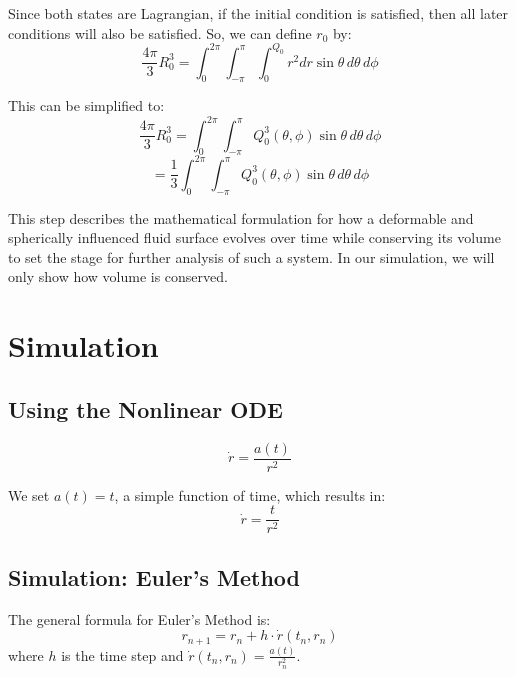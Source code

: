 \documentclass{article}
\begin{document}
Since both states are Lagrangian, if the initial condition is satisfied, then all later conditions will also be satisfied. So, we can define \(r_0\) by:
\begin{equation}
\frac{4\pi}{3} R_0^3 = \int_{0}^{2\pi} \int_{-\pi}^{\pi} \int_{0}^{Q_0} r^2 dr \sin\theta \, d\theta \, d\phi
\end{equation}

This can be simplified to:
\begin{equation}
\frac{4\pi}{3} R_0^3 = \int_{0}^{2\pi} \int_{-\pi}^{\pi} Q_0^3(\theta, \phi) \sin\theta \, d\theta \, d\phi
\end{equation}
\begin{equation}
= \frac{1}{3} \int_{0}^{2\pi} \int_{-\pi}^{\pi} Q_0^3(\theta, \phi) \sin\theta \, d\theta \, d\phi
\end{equation}

This step describes the mathematical formulation for how a deformable and spherically influenced fluid surface evolves over time while conserving its volume to set the stage for further analysis of such a system. In our simulation, we will only show how volume is conserved.

\section{Simulation}

\subsection{Using the Nonlinear ODE}
\begin{equation}
\dot{r} = \frac{a(t)}{r^2}
\end{equation}

We set \( a(t) = t \), a simple function of time, which results in:
\begin{equation}
\dot{r} = \frac{t}{r^2}
\end{equation}

\subsection{Simulation: Euler's Method}

The general formula for Euler's Method is:
\begin{equation}
r_{n+1} = r_n + h \cdot \dot{r}(t_n, r_n)
\end{equation}
where \( h \) is the time step and \( \dot{r}(t_n, r_n) = \frac{a(t)}{r_n^2} \).
\end{document}

